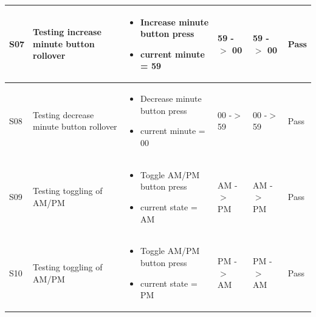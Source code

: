 \documentclass[12pt]{article}
\begin{document}
\begin{tabularx}{\textwidth}{|X|p{}|p{}|p{}|p{}|p{}|}
        \hline
        S07  &  Testing increase minute button rollover & 
        \begin{itemize}[leftmargin=*,topsep=0ex,parsep=0pt]
            \item Increase minute button press 
            \item current minute = 59
        \end{itemize}
        & 59 -$>$ 00 & 59 -$>$ 00 & Pass \\
        
       \hline
        S08  &  Testing decrease minute button rollover & 
        \begin{itemize}[leftmargin=*,topsep=0ex,parsep=0pt]
            \item Decrease minute button press
            \item current minute = 00
        \end{itemize}
        & 00 -$>$ 59 & 00 -$>$ 59 & Pass \\
        
        \hline
        S09  &  Testing toggling of AM/PM & 
        \begin{itemize}[leftmargin=*,topsep=0ex,parsep=0pt]
            \item Toggle AM/PM button press
            \item  current state = AM
        \end{itemize}
        & AM -$>$ PM & AM -$>$ PM & Pass \\
        
        \hline
        S10  &  Testing toggling of AM/PM &
        \begin{itemize}[leftmargin=*,topsep=0ex,parsep=0pt]
            \item Toggle AM/PM button press
            \item   current state = PM
        \end{itemize}
        & PM -$>$ AM & PM -$>$ AM & Pass \\
        

\end{tabularx}
\end{document}
